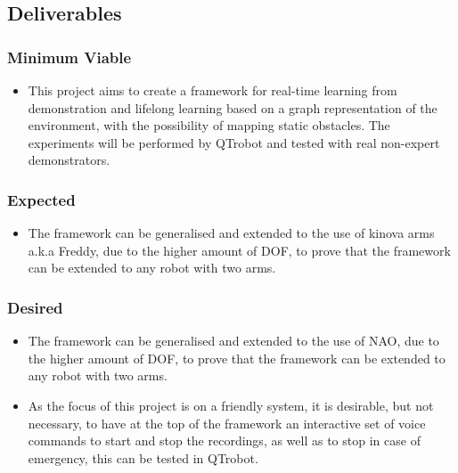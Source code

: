 \documentclass[thesis]{mas_proposal}
\begin{document}
	\subsection{Deliverables}
	
	\subsubsection*{Minimum Viable}
	\begin{itemize}
	    \item This project aims to create a framework for real-time learning from demonstration and lifelong learning based on a graph representation of the environment, with the possibility of mapping static obstacles. The experiments will be performed by QTrobot and tested with real non-expert demonstrators. 
	\end{itemize}
	\subsubsection*{Expected}
	\begin{itemize}
	    \item The framework can be generalised and extended to the use of kinova arms a.k.a Freddy, due to the higher amount of DOF, to prove that the framework can be extended to any robot with two arms.
	\end{itemize}
	\subsubsection*{Desired}
	\begin{itemize}
		\item The framework can be generalised and extended to the use of NAO, due to the higher amount of DOF, to prove that the framework can be extended to any robot with two arms.
		
	    \item As the focus of this project is on a friendly system, it is desirable, but not necessary, to have at the top of the framework an interactive set of voice commands to start and stop the recordings, as well as to stop in case of emergency, this can be tested in QTrobot.
	\end{itemize}
	
	\nocite{*}
	
	
\end{document}
